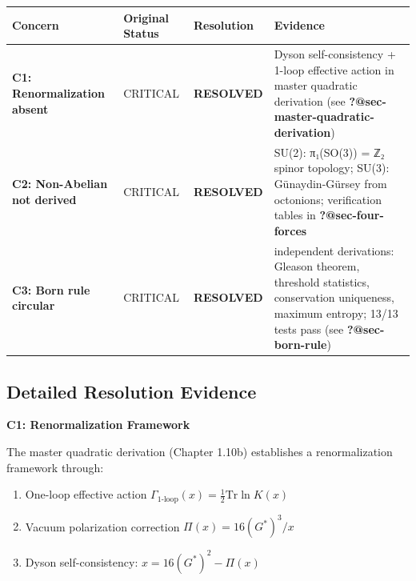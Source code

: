 \documentclass[
  11pt,
  letterpaper,
  twoside,
  openany]{book}
\makeatletter
\providecommand{\tightlist}{%
  \setlength{\itemsep}{0pt}\setlength{\parskip}{0pt}}
\let\orig@subsection\subsection
\renewcommand{\subsection}{\needspace{6\baselineskip}\orig@subsection}
\makeatother
\begin{document}
\begin{longtable}[]{@{}
  >{\raggedright\arraybackslash}p{}
  >{\raggedright\arraybackslash}p{}
  >{\raggedright\arraybackslash}p{}
  >{\raggedright\arraybackslash}p{}@{}}
\toprule\noalign{}
\begin{minipage}[b]{\linewidth}\raggedright
Concern
\end{minipage} & \begin{minipage}[b]{\linewidth}\raggedright
Original Status
\end{minipage} & \begin{minipage}[b]{\linewidth}\raggedright
Resolution
\end{minipage} & \begin{minipage}[b]{\linewidth}\raggedright
Evidence
\end{minipage} \\
\midrule\noalign{}
\endhead
\bottomrule\noalign{}
\endlastfoot
\textbf{C1: Renormalization absent} & CRITICAL & \textbf{RESOLVED} &
Dyson self-consistency + 1-loop effective action in master quadratic
derivation (see \textbf{?@sec-master-quadratic-derivation}) \\
\textbf{C2: Non-Abelian not derived} & CRITICAL & \textbf{RESOLVED} &
SU(2): π₁(SO(3)) = ℤ₂ spinor topology; SU(3): Günaydin-Gürsey from
octonions; verification tables in \textbf{?@sec-four-forces} \\
\textbf{C3: Born rule circular} & CRITICAL & \textbf{RESOLVED} & 4
independent derivations: Gleason theorem, threshold statistics,
conservation uniqueness, maximum entropy; 13/13 tests pass (see
\textbf{?@sec-born-rule}) \\
\end{longtable}

\subsection{Detailed Resolution
Evidence}\label{detailed-resolution-evidence}

\textbf{C1: Renormalization Framework}

The master quadratic derivation (Chapter 1.10b) establishes a
renormalization framework through:

\begin{enumerate}
\def\labelenumi{\arabic{enumi}.}
\tightlist
\item
  One-loop effective action
  \(\Gamma_{\text{1-loop}}(x) = \frac{1}{2}\text{Tr}\ln K(x)\)
\item
  Vacuum polarization correction \(\Pi(x) = 16(G^*)^3/x\)
\item
  Dyson self-consistency: \(x = 16(G^*)^2 - \Pi(x)\)
\end{enumerate}
\end{document}

